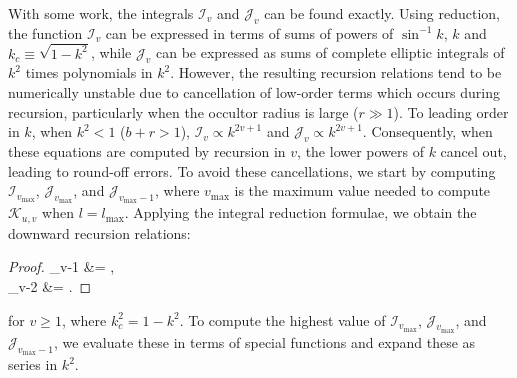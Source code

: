 \documentclass[modern]{aastex61}
\begin{document}
With some work, the integrals $\mathcal{I}_v$ and $\mathcal{J}_v$ can be found exactly.
Using reduction, the function $\mathcal{I}_v$ can be expressed
in terms of sums of powers of $\sin^{-1}k$, $k$ and $k_c \equiv \sqrt{1-k^2}$, while $\mathcal{J}_v$ can be expressed
as sums of complete elliptic integrals of $k^2$ times polynomials in $k^2$. However, the resulting
recursion relations tend to be numerically unstable due to cancellation of low-order terms which occurs
during recursion, particularly when the occultor radius is large ($r \gg 1$).
To leading order in $k$, when $k^2 <1$ ($b + r > 1$),
$\mathcal{I}_v \propto k^{2v+1}$
and $\mathcal{J}_v \propto k^{2v+1}$.  Consequently, when these equations are computed by
recursion in $v$, the lower powers of $k$ cancel out, leading to
round-off errors.  To avoid these cancellations, we start by computing $\mathcal{I}_{v_\mathrm{max}}$,
$\mathcal{J}_{v_\mathrm{max}}$, and $\mathcal{J}_{v_\mathrm{max}-1}$, where
$v_\mathrm{max}$ is the maximum value needed to compute $\mathcal{K}_{u,v}$ when
$l = l_\mathrm{max}$.  %
Applying the integral reduction formulae, we obtain the downward recursion relations:
%
\begin{proof}{}
    \label{eq:IJdownward}
    _{v-1} &=  ,\\
    _{v-2} &= .
\end{proof}
%
for $v \ge 1$, where $k_c^2=1-k^2$.
To compute the highest value of $\mathcal{I}_{v_\mathrm{max}}$, $\mathcal{J}_{v_\mathrm{max}}$,
and  $\mathcal{J}_{v_\mathrm{max}-1}$, we evaluate these in terms of special
functions and expand these as series in $k^2$.

\end{document}
